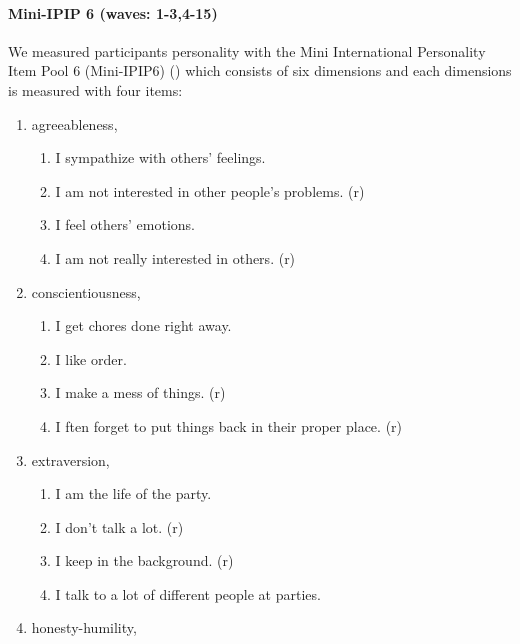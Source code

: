 \documentclass[
  singlecolumn]{article}
\let\oldparagraph\paragraph
\renewcommand{\paragraph}[1]{\oldparagraph{#1}\mbox{}}
\providecommand{\tightlist}{%
  \setlength{\itemsep}{0pt}\setlength{\parskip}{0pt}}\usepackage{longtable,booktabs,array}
\begin{document}
\paragraph{Mini-IPIP 6 (waves:
1-3,4-15)}\label{mini-ipip-6-waves-1-34-15}

We measured participants personality with the Mini International
Personality Item Pool 6 (Mini-IPIP6) () which consists of six dimensions and each
dimensions is measured with four items:

\begin{enumerate}
\def\labelenumi{\arabic{enumi}.}
\item
  agreeableness,

  \begin{enumerate}
  \def\labelenumii{\roman{enumii}.}
  \tightlist
  \item
    I sympathize with others' feelings.
  \item
    I am not interested in other people's problems. (r)
  \item
    I feel others' emotions.
  \item
    I am not really interested in others. (r)
  \end{enumerate}
\item
  conscientiousness,

  \begin{enumerate}
  \def\labelenumii{\roman{enumii}.}
  \tightlist
  \item
    I get chores done right away.
  \item
    I like order.
  \item
    I make a mess of things. (r)
  \item
    I ften forget to put things back in their proper place. (r)
  \end{enumerate}
\item
  extraversion,

  \begin{enumerate}
  \def\labelenumii{\roman{enumii}.}
  \tightlist
  \item
    I am the life of the party.
  \item
    I don't talk a lot. (r)
  \item
    I keep in the background. (r)
  \item
    I talk to a lot of different people at parties.
  \end{enumerate}
\item
  honesty-humility,


\end{enumerate}
\end{document}
